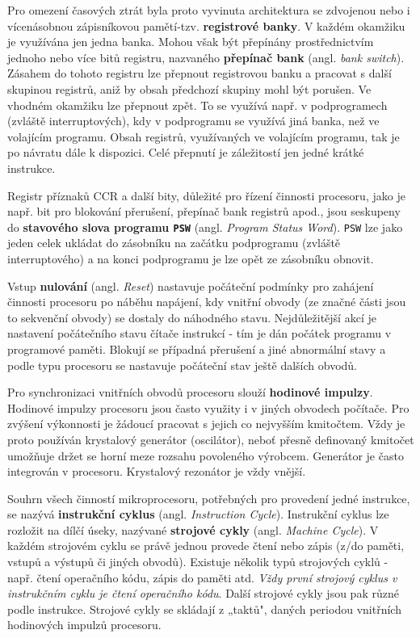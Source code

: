     Pro omezení časových ztrát byla proto vyvinuta architektura se zdvojenou nebo i vícenásobnou 
    zápisníkovou pamětí-tzv. \textbf{registrové banky}. V každém okamžiku je využívána jen jedna 
    banka. Mohou však být přepínány prostřednictvím jednoho nebo více bitů registru, nazvaného 
    \textbf{přepínač bank} (angl. \emph{bank switch}). Zásahem do tohoto registru lze přepnout 
    registrovou banku a pracovat s další skupinou registrů, aniž by obsah předchozí skupiny mohl 
    být porušen. Ve vhodném okamžiku lze přepnout zpět. To se využívá např. v podprogramech 
    (zvláště interruptových), kdy v podprogramu se využívá jiná banka, než ve volajícím programu. 
    Obsah registrů, využívaných ve volajícím programu, tak je po návratu dále k dispozici. Celé 
    přepnutí je záležitostí jen jedné krátké instrukce.
    
    Registr příznaků CCR a další bity, důležité pro řízení činnosti procesoru, jako je např. bit 
    pro blokování přerušení, přepínač bank registrů apod., jsou seskupeny do \textbf{stavového 
    slova programu \texttt{PSW}} (angl. \emph{Program Status Word}). \texttt{PSW} lze jako jeden 
    celek ukládat do zásobníku na začátku podprogramu (zvláště interruptového) a na konci 
    podprogramu je lze opět ze zásobníku obnovit.
    
    Vstup \textbf{nulování} (angl. \emph{Reset}) nastavuje počáteční podmínky pro zahájení činnosti 
    procesoru po náběhu napájení, kdy vnitřní obvody (ze značné části jsou to sekvenční obvody) se 
    dostaly do náhodného stavu. Nejdůležitější akcí je nastavení počátečního stavu čítače instrukcí 
    - tím je dán počátek programu v programové paměti. Blokují se případná přerušení a jiné 
    abnormální stavy a podle typu procesoru se nastavuje počáteční stav ještě dalších obvodů.
    
    Pro synchronizaci vnitřních obvodů procesoru slouží \textbf{hodinové impulzy}. Hodinové impulzy 
    procesoru jsou často využity i v jiných obvodech počítače. Pro zvýšení výkonnosti je žádoucí 
    pracovat s jejich co nejvyšším kmitočtem. Vždy je proto používán krystalový generátor 
    (oscilátor), neboť přesně definovaný kmitočet umožňuje držet se horní meze rozsahu povoleného 
    výrobcem. Generátor je často integrován v procesoru. Krystalový rezonátor je vždy vnější.
    
    Souhrn všech činností mikroprocesoru, potřebných pro provedení jedné instrukce, se nazývá 
    \textbf{instrukční cyklus} (angl. \emph{Instruction Cycle}). Instrukční cyklus lze rozložit na 
    dílčí úseky, nazývané \textbf{strojové cykly} (angl. \emph{Machine Cycle}). V každém strojovém 
    cyklu se právě jednou provede čtení nebo zápis (z/do paměti, vstupů a výstupů či jiných 
    obvodů). Existuje několik typů strojových cyklů - např. čtení operačního kódu, zápis do paměti 
    atd. \emph{Vždy první strojový cyklus v instrukčním cyklu je čtení operačního kódu}. Další 
    strojové cykly jsou pak různé podle instrukce. Strojové cykly se skládají z „taktů", daných 
    periodou vnitřních hodinových impulzů procesoru.
    
